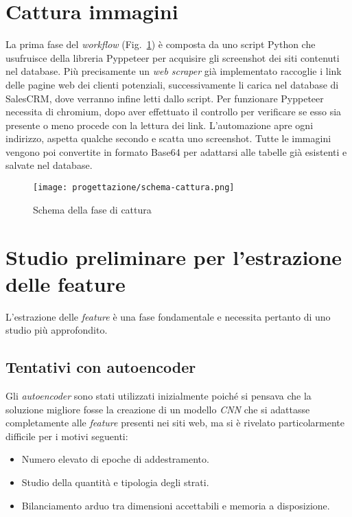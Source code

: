 \section{Cattura immagini}
La prima fase del \emph{\gls{workflow}} (Fig.~\ref{fig:schema-cattura}) è composta da uno script Python che usufruisce della libreria Pyppeteer per acquisire gli screenshot dei siti contenuti nel database.
Più precisamente un \emph{web scraper} già implementato raccoglie i link delle pagine web dei clienti potenziali, successivamente li carica nel database di SalesCRM, dove verranno infine letti dallo script.
Per funzionare Pyppeteer necessita di chromium, dopo aver effettuato il controllo per verificare se esso sia presente o meno procede con la lettura dei link. 
L'automazione apre ogni indirizzo, aspetta qualche secondo e scatta uno screenshot. 
Tutte le immagini vengono poi convertite in formato Base64 per adattarsi alle tabelle già esistenti e salvate nel database.

\begin{figure}[!h] 
  \centering 
  \texttt{[image: progettazione/schema-cattura.png]} 
  \caption{Schema della fase di cattura}
  \label{fig:schema-cattura}
\end{figure}

\newpage

\section{Studio preliminare per l'estrazione delle feature}
L'estrazione delle \emph{\gls{feature}} è una fase fondamentale e necessita pertanto di uno studio più approfondito.

\subsection{Tentativi con autoencoder}
Gli \emph{autoencoder} sono stati utilizzati inizialmente poiché si pensava che la soluzione migliore fosse la creazione di un modello \emph{CNN} che si adattasse completamente alle \emph{\gls{feature}} presenti nei siti web, ma si è rivelato particolarmente difficile per i motivi seguenti:
\begin{itemize}
  \item Numero elevato di epoche di addestramento.
  \item Studio della quantità e tipologia degli strati.
  \item Bilanciamento arduo tra dimensioni accettabili e memoria a disposizione.
\end{itemize}

